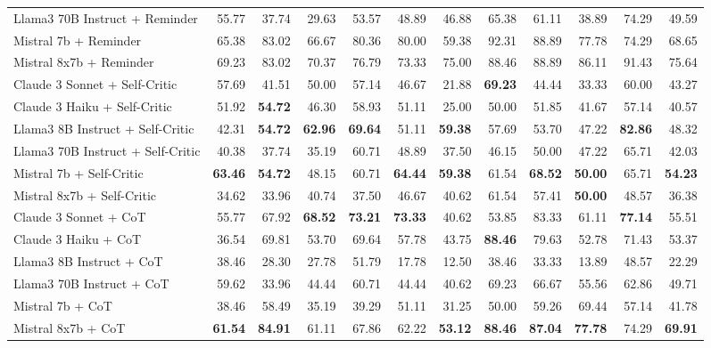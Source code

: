 \begin{table}[H]
{\begin{tabular}{lrrrrrrrrrrr}
Llama3 70B Instruct + Reminder & 55.77 & 37.74 & 29.63 & 53.57 & 48.89 & 46.88 & 65.38 & 61.11 & 38.89 & 74.29 & 49.59 \\
Mistral 7b + Reminder & 65.38 & 83.02 & 66.67 & 80.36 & 80.00 & 59.38 & 92.31 & 88.89 & 77.78 & 74.29 & 68.65 \\
Mistral 8x7b + Reminder & 69.23 & 83.02 & 70.37 & 76.79 & 73.33 & 75.00 & 88.46 & 88.89 & 86.11 & 91.43 & 75.64 \\
\rowcolor{Gray}
Claude 3 Sonnet + Self-Critic & 57.69 & 41.51 & 50.00 & 57.14 & 46.67 & 21.88 & \textbf{69.23} & 44.44 & 33.33 & 60.00 & 43.27 \\
\rowcolor{Gray}
Claude 3 Haiku + Self-Critic & 51.92 & \textbf{54.72} & 46.30 & 58.93 & 51.11 & 25.00 & 50.00 & 51.85 & 41.67 & 57.14 & 40.57 \\
\rowcolor{Gray}
Llama3 8B Instruct + Self-Critic & 42.31 & \textbf{54.72} & \textbf{62.96} & \textbf{69.64} & 51.11 & \textbf{59.38} & 57.69 & 53.70 & 47.22 & \textbf{82.86} & 48.32 \\
\rowcolor{Gray}
Llama3 70B Instruct + Self-Critic & 40.38 & 37.74 & 35.19 & 60.71 & 48.89 & 37.50 & 46.15 & 50.00 & 47.22 & 65.71 & 42.03 \\
\rowcolor{Gray}
Mistral 7b + Self-Critic & \textbf{63.46} & \textbf{54.72} & 48.15 & 60.71 & \textbf{64.44} & \textbf{59.38} & 61.54 & \textbf{68.52} & \textbf{50.00} & 65.71 & \textbf{54.23} \\
\rowcolor{Gray}
Mistral 8x7b + Self-Critic & 34.62 & 33.96 & 40.74 & 37.50 & 46.67 & 40.62 & 61.54 & 57.41 & \textbf{50.00} & 48.57 & 36.38 \\
Claude 3 Sonnet + CoT & 55.77 & 67.92 & \textbf{68.52} & \textbf{73.21} & \textbf{73.33} & 40.62 & 53.85 & 83.33 & 61.11 & \textbf{77.14} & 55.51 \\
Claude 3 Haiku + CoT & 36.54 & 69.81 & 53.70 & 69.64 & 57.78 & 43.75 & \textbf{88.46} & 79.63 & 52.78 & 71.43 & 53.37 \\
Llama3 8B Instruct + CoT & 38.46 & 28.30 & 27.78 & 51.79 & 17.78 & 12.50 & 38.46 & 33.33 & 13.89 & 48.57 & 22.29 \\
Llama3 70B Instruct + CoT & 59.62 & 33.96 & 44.44 & 60.71 & 44.44 & 40.62 & 69.23 & 66.67 & 55.56 & 62.86 & 49.71 \\
Mistral 7b + CoT & 38.46 & 58.49 & 35.19 & 39.29 & 51.11 & 31.25 & 50.00 & 59.26 & 69.44 & 57.14 & 41.78 \\
Mistral 8x7b + CoT & \textbf{61.54} & \textbf{84.91} & 61.11 & 67.86 & 62.22 & \textbf{53.12} & \textbf{88.46} & \textbf{87.04} & \textbf{77.78} & 74.29 & \textbf{69.91} \\

\end{tabular}}
\end{table}
